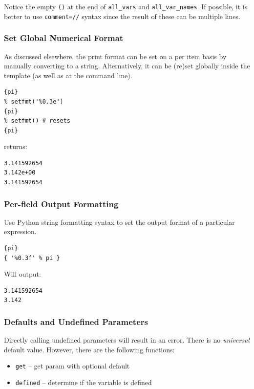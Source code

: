 {Notice the empty \texttt{()} at the end of \texttt{all\_vars} and
\texttt{all\_var\_names}. If possible, it is better to use
\texttt{comment=\textquotesingle{}//\textquotesingle{}} syntax since the
result of these can be multiple lines.

\subsubsection{Set Global Numerical Format}\label{interfaces:set-global-print-format} 
As discussed elsewhere, the print format can be set on a per item basis
by manually converting to a string. Alternatively, it can be (re)set
globally inside the template (as well as at the command line).

\begin{verbatim}
{pi}
% setfmt('%0.3e')
{pi}
% setfmt() # resets
{pi}
\end{verbatim}

returns:

\begin{verbatim}
3.141592654
3.142e+00
3.141592654
\end{verbatim}

\subsubsection{Per-field Output Formatting}\label{interfaces:per-field-output-formatting}

Use Python string formatting syntax to set the output format of a particular 
expression.

\begin{verbatim}
{pi}
{ '%0.3f' % pi }
\end{verbatim}

Will output:

\begin{verbatim}
3.141592654
3.142
\end{verbatim}

\subsubsection{Defaults and Undefined Parameters}\label{interfaces:using-defaults-undefined-parameters}

Directly calling undefined parameters will result in an error. There is
no \emph{universal} default value. However, there are the following
functions:

\begin{itemize}
\tightlist
\item
  \texttt{get} -- get param with optional default
\item
  \texttt{defined} -- determine if the variable is defined
\end{itemize}

}
